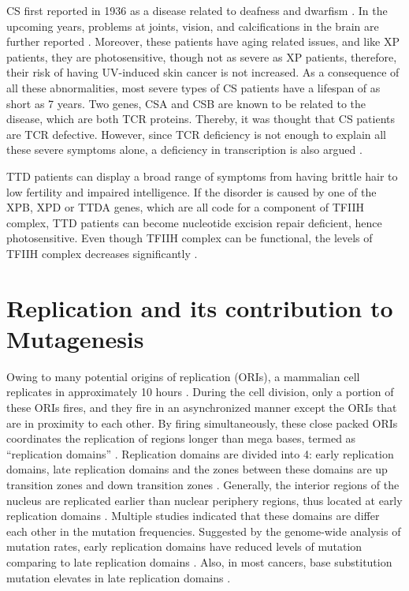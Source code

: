 CS first reported in 1936 as a disease related to deafness and dwarfism \citep{cockayne1936dwarfism}. In the upcoming years, problems at joints, vision, and calcifications in the brain are further reported \citep{cockayne1946dwarfism,neill1950syndrome}. Moreover, these patients have aging related issues, and like XP patients, they are photosensitive, though not as severe as XP patients, therefore, their risk of having UV-induced skin cancer is not increased. As a consequence of all these abnormalities, most severe types of CS patients have a lifespan of as short as 7 years. Two genes, CSA and CSB are known to be related to the disease, which are both TCR proteins. Thereby, it was thought that CS patients are TCR defective. However, since TCR deficiency is not enough to explain all these severe symptoms alone, a deficiency in transcription is also argued \citep{drapkin1994dual}.

TTD patients can display a broad range of symptoms from having brittle hair to low fertility and impaired intelligence. If the disorder is caused by one of the XPB, XPD or TTDA genes, which are all code for a component of TFIIH complex, TTD patients can become nucleotide excision repair deficient, hence photosensitive. Even though TFIIH complex can be functional, the levels of TFIIH complex decreases significantly \citep{giglia2006dynamic}.

\section{Replication and its contribution to Mutagenesis}

Owing to many potential origins of replication (ORIs), a mammalian cell replicates in approximately 10 hours \citep{takebayashi2017anatomy}. During the cell division, only a portion of these ORIs fires, and they fire in an asynchronized manner except the ORIs that are in proximity to each other. By firing simultaneously, these close packed ORIs coordinates the replication of regions longer than mega bases, termed as “replication domains” \citep{jackson1998replicon}. Replication domains are divided into 4: early replication domains, late replication domains and the zones between these domains are up transition zones and down transition zones \citep{farkash2008global,hansen2010sequencing,hiratani2008global,koren2014genetic,nakayasu1989mapping,o1992dynamic}. Generally, the interior regions of the nucleus are replicated earlier than nuclear periphery regions, thus located at early replication domains \citep{dimitrova2002spatio}. Multiple studies indicated that these domains are differ each other in the mutation frequencies. Suggested by the genome-wide analysis of mutation rates, early replication domains have reduced levels of mutation comparing to late replication domains \citep{lawrence2013mutational,stamatoyannopoulos2009human}. Also, in most cancers, base substitution mutation elevates in late replication domains \citep{schuster2012chromatin}.


